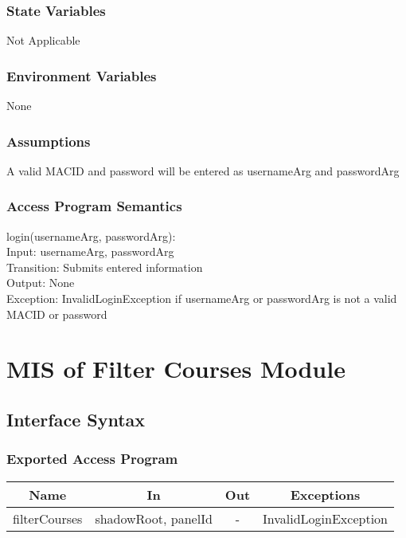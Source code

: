 \documentclass[12pt, titlepage]{article}
\begin{document}
\subsubsection{State Variables}
Not Applicable
\subsubsection{Environment Variables}
None
\subsubsection{Assumptions}
A valid MACID and password will be entered as usernameArg and passwordArg

\subsubsection{Access Program Semantics}
login(usernameArg, passwordArg):\\

    Input: usernameArg, passwordArg\\

    Transition: Submits entered information\\

    Output: None\\

    Exception: InvalidLoginException if usernameArg or passwordArg is not a valid MACID or password\\


\newpage




\section{MIS of Filter Courses Module}
\subsection{Interface Syntax}
\subsubsection{Exported Access Program}
\begin{tabular}[pos]{|c|c|c|c|}
    \hline
    \textbf{Name}& \textbf{In} & \textbf{Out} & \textbf{Exceptions} \\ \hline
    filterCourses & shadowRoot, panelId & - & InvalidLoginException \\ \hline
\end{tabular}
\end{document}
